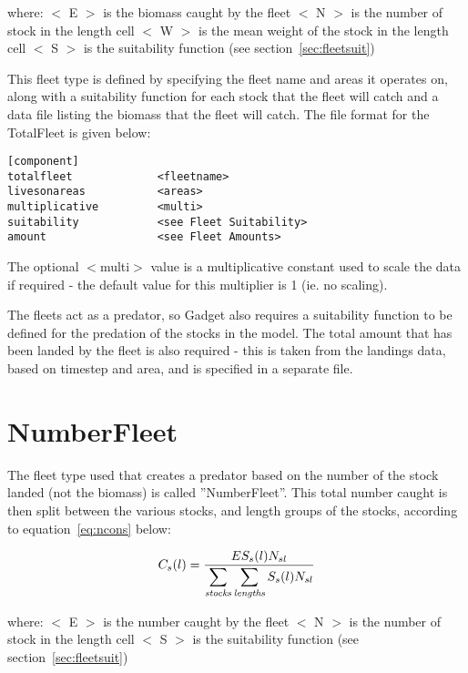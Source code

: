 \documentclass[10pt,twoside]{book}
\begin{document}
where:\newline
$<$ E $>$ is the biomass caught by the fleet\newline
$<$ N $>$ is the number of stock in the length cell\newline
$<$ W $>$ is the mean weight of the stock in the length cell\newline
$<$ S $>$ is the suitability function (see section~\ref{sec:fleetsuit})

\bigskip
This fleet type is defined by specifying the fleet name and areas it operates on, along with a suitability function for each stock that the fleet will catch and a data file listing the biomass that the fleet will catch.  The file format for the TotalFleet is given below:

{\small\begin{verbatim}
[component]
totalfleet             <fleetname>
livesonareas           <areas>
multiplicative         <multi>
suitability            <see Fleet Suitability>
amount                 <see Fleet Amounts>
\end{verbatim}}

The optional $<$multi$>$ value is a multiplicative constant used to scale the data if required - the default value for this multiplier is 1 (ie. no scaling).

\bigskip
The fleets act as a predator, so Gadget also requires a suitability function to be defined for the predation of the stocks in the model.  The total amount that has been landed by the fleet is also required - this is taken from the landings data, based on timestep and area, and is specified in a separate file.

\section{NumberFleet}\label{sec:numberfleet}
The fleet type used that creates a predator based on the number of the stock landed (not the biomass) is called ''NumberFleet''.  This total number caught is then split between the various stocks, and length groups of the stocks, according to equation~\ref{eq:ncons} below:

\begin{equation}\label{eq:ncons}
C_{s}(l) = \frac{E S_{s}(l) N_{sl}}{\displaystyle \sum_{\it stocks} \sum_{\it lengths} S_{s}(l) N_{sl}}
\end{equation}

where:\newline
$<$ E $>$ is the number caught by the fleet\newline
$<$ N $>$ is the number of stock in the length cell\newline
$<$ S $>$ is the suitability function (see section~\ref{sec:fleetsuit})
\end{document}
